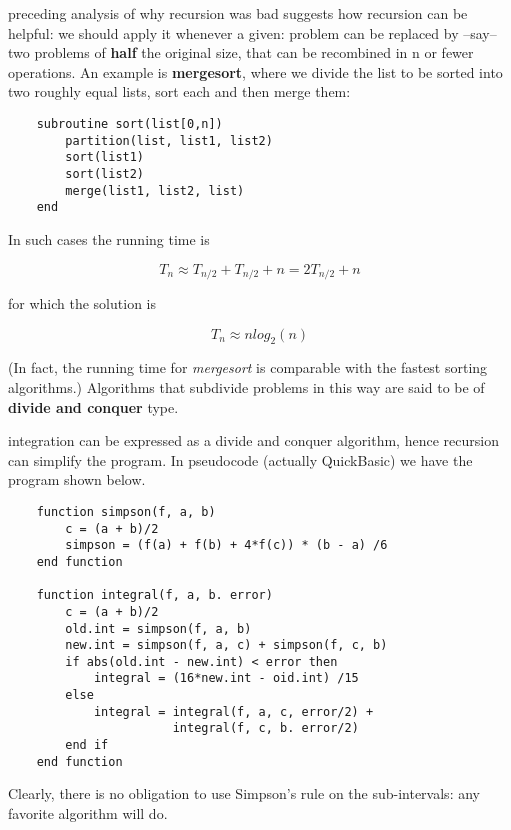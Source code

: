  preceding analysis of why recursion was bad suggests how recursion can be helpful: we should apply it whenever a given: problem can be replaced by --say-- two problems of \textbf{half} the original size, that can be recombined in n or fewer operations. An example is \textbf{mergesort}, where we divide the list to be sorted into two roughly equal lists, sort each and then merge them:

\begin{verbatim}
    subroutine sort(list[0,n])
        partition(list, list1, list2)
        sort(list1)
        sort(list2)
        merge(list1, list2, list)
    end
\end{verbatim}

In such cases the running time is

\begin{equation}
T_{n} \approx T_{n/2} + T_{n/2} + n = 2T_{n/2} + n
\end{equation}

for which the solution is

\begin{equation}
T_{n} \approx n log_2 (n)
\end{equation}

(In fact, the running time for \textit{mergesort} is comparable with the fastest sorting algorithms.) Algorithms that subdivide problems in this way are said to be of \textbf{divide and conquer} type.

 integration can be expressed as a divide and conquer algorithm, hence recursion can simplify the program. In pseudocode (actually QuickBasic\textregistered) we have the program shown
below.

\begin{verbatim}
    function simpson(f, a, b)
        c = (a + b)/2
        simpson = (f(a) + f(b) + 4*f(c)) * (b - a) /6
    end function

    function integral(f, a, b. error)
        c = (a + b)/2
        old.int = simpson(f, a, b)
        new.int = simpson(f, a, c) + simpson(f, c, b)
        if abs(old.int - new.int) < error then
            integral = (16*new.int - oid.int) /15
        else
            integral = integral(f, a, c, error/2) +
                       integral(f, c, b. error/2)
        end if
    end function
\end{verbatim}

Clearly, there is no obligation to use Simpson's rule on the sub-intervals: any favorite algorithm will do.

